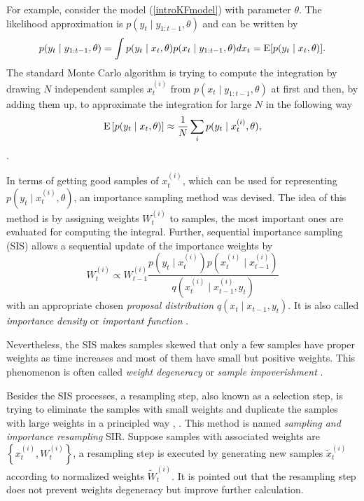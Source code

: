For example, consider the model (\ref{introKFmodel}) with parameter $\theta$. The likelihood approximation is $p(y_t\mid y_{1:t-1},\theta)$ and can be written by
\begin{equation*}
p(y_t\mid y_{1:t-1},\theta) = \int p(y_t\mid x_t,\theta)p(x_t\mid y_{1:t-1},\theta) dx_t = \mathrm{E} \lbrack p(y_t\mid x_t,\theta)\rbrack.
\end{equation*}
The standard Monte Carlo algorithm is trying to compute the integration by drawing $N$ independent samples $x_t^{(i)}$ from $p(x_t\mid y_{1:t-1},\theta)$ at first and then, by adding them up, to approximate the integration for large $N$ in the following way 
\begin{equation*}
\mathrm{E}\left[p(y_t\mid x_t,\theta)\right]\approx \frac{1}{N}\sum_i p(y_t\mid x_t^{(i)},\theta), 
\end{equation*}
\cite{kalos2008monte}.

In terms of getting good samples of $x_t^{(i)}$, which can be used for representing $p(y_t\mid x_t^{(i)},\theta)$, an importance sampling method was devised. The idea of this method is by assigning weights $W_t^{(i)}$ to samples, the most important ones are evaluated for computing the integral. Further, sequential importance sampling (SIS) allows a sequential update of the importance weights by 
\begin{equation*}
W_t^{(i)} \propto W_{t-1}^{(i)} \frac{ p\left(y_t \mid x_t^{(i)}\right) p\left(x_{t}^{(i)}\mid x_{t-1}^{(i)}\right) }{q\left(x_{t}^{(i)}\mid x_{t-1}^{(i)},y_{t}\right)}
\end{equation*}
with an appropriate chosen \textit{proposal distribution} $q(x_{t}\mid  x_{t-1},y_{t})$. It is also called \textit{importance density} or \textit{important function} \cite{chen2003bayesian}. 


Nevertheless, the SIS makes samples skewed that only a few samples have proper weights as time increases and most of them have small but positive weights. This phenomenon is often called \textit{weight degeneracy} or \textit{sample impoverishment} \cite{green1995reversible} \cite{berzuini1997dynamic}. 


Besides the SIS processes, a resampling step, also known as a selection step, is trying to eliminate the samples with small weights and duplicate the samples with large weights in a principled way \cite{rubin2004multiple}, \cite{tanner1987calculation}. This method is named \textit{sampling and importance resampling} SIR. Suppose samples with associated weights are $\left\lbrace x_t^{(i)},W_t^{(i)}\right\rbrace$, a resampling step is executed by generating new samples $\tilde{x}_t^{(i)}$ according to normalized weights $\tilde{W}_t^{(i)}$. It is pointed out that the resampling step does not prevent weights degeneracy but improve further calculation. 

